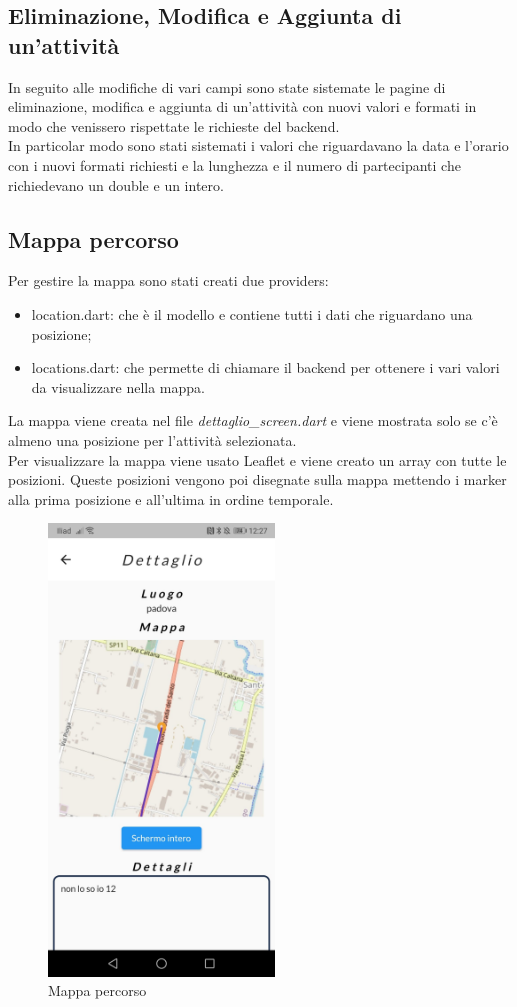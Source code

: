 \subsection{Eliminazione, Modifica e Aggiunta di un'attività}
In seguito alle modifiche di vari campi sono state sistemate le pagine di eliminazione, modifica e aggiunta di un'attività con nuovi valori e formati in modo che venissero rispettate le richieste del backend.\\
In particolar modo sono stati sistemati i valori che riguardavano la data e l'orario con i nuovi formati richiesti e la lunghezza e il numero di partecipanti che richiedevano un double e un intero.

\newpage

\subsection{Mappa percorso}
Per gestire la mappa sono stati creati due providers:
\begin{itemize}
	\item location.dart: che è il modello e contiene tutti i dati che riguardano una posizione;
	\item locations.dart: che permette di chiamare il backend per ottenere i vari valori da visualizzare nella mappa.
\end{itemize}
La mappa viene creata nel file \textit{dettaglio\_screen.dart} e viene mostrata solo se c'è almeno una posizione per l'attività selezionata.\\
Per visualizzare la mappa viene usato Leaflet e viene creato un array con tutte le posizioni. Queste posizioni vengono poi disegnate sulla mappa mettendo i marker alla prima posizione e all'ultima in ordine temporale.\\

\begin{figure}[htbp]	
	\centering
	\includegraphics[width=6cm]{immagini/mappa.jpeg}
	\caption{Mappa percorso}
	\label{fig:Mappa percorso}
\end{figure}

